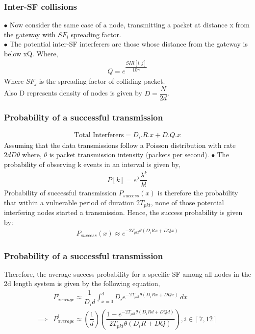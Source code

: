\documentclass{beamer}
\begin{document}
\begin{frame}
\frametitle{Inter-SF collisions}
$\bullet$ Now consider the same case of a node, transmitting a packet at distance x from the gateway with $SF_i$ spreading factor.\\
$\bullet$ The potential inter-SF interferers are those whose distance from the gateway is below xQ. Where,
\begin{align}
Q= e^{\dfrac{SIR[i,j]}{10\gamma}}
\end{align}
Where $SF_j$ is the spreading factor of colliding packet.\\
Also D represents density of nodes is given by $D=\dfrac{N}{2d}$.
\end{frame}

\begin{frame}
\frametitle{Probability of a successful transmission}
\begin{align}
\text{Total Interferers} = D_i.R.x + D.Q.x
\end{align}
Assuming that the data transmissions follow a Poisson distribution with rate $2dD \theta$ where, $\theta$ is packet transmission intensity (packets per second).
$\bullet$  The probability of observing k events in an interval is given by,
\begin{align}
P[k]=e^{\lambda} \dfrac{\lambda^k}{k!}
\end{align}
Probability of successful transmission $P_{success}(x)$ is therefore the probability that within a vulnerable period of duration $2T_{pkt}$, none of those potential interfering nodes started a transmission. Hence, the success probability is given by:
\begin{align}
P_{success}(x) \approx e^{-2T_{pkt} \theta (D_iRx+DQx)}
\end{align}

\end{frame}


\begin{frame}
\frametitle{Probability of a successful transmission}
Therefore, the average success probability for a specific SF among all nodes in the 2d length system is given by the following equation,
\begin{align}
& P_{average}^i \approx \dfrac{1}{D_i d} \int_{x=0}^{d} D_i e^{-2T_{pkt} \theta (D_iRx+DQx)}\,dx\\
\implies & P_{average}^i \approx \left(\dfrac{1}{d}\right) \left(\dfrac{1-e^{-2T_{pkt} \theta (D_iRd+DQd)}}{2T_{pkt} \theta (D_i R+DQ)}\right),i \in [7,12]
\end{align}
\end{frame}
\end{document}
